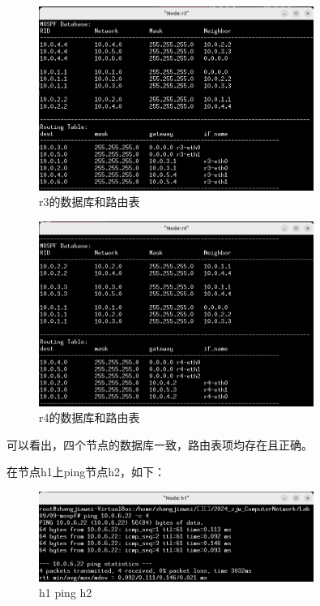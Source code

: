 \documentclass[UTF8]{report}
\begin{document}
\begin{figure}[H]
    \centering
    \includegraphics[width=0.8\textwidth]{r3table.png}
    \caption{r3的数据库和路由表}
\end{figure}

\begin{figure}[H]
    \centering
    \includegraphics[width=0.8\textwidth]{r4table.png}
    \caption{r4的数据库和路由表}
\end{figure}

可以看出，四个节点的数据库一致，路由表项均存在且正确。

在节点h1上ping节点h2，如下：

\begin{figure}[H]
    \centering
    \includegraphics[width=0.8\textwidth]{h1pingh2.png}
    \caption{h1 ping h2}
\end{figure}
\end{document}
